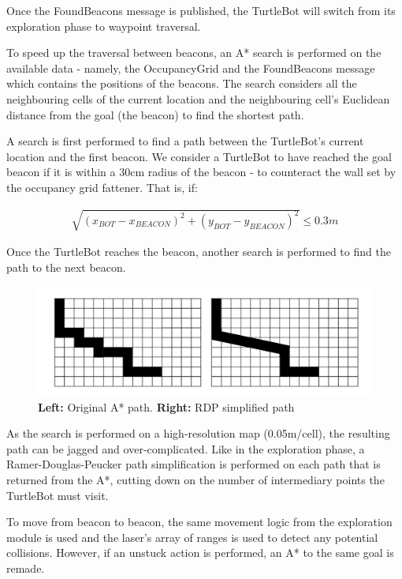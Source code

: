 \documentclass[titlepage,12pt,a4paper]{article}
\begin{document}
Once the FoundBeacons message is published, the TurtleBot will switch from its exploration phase to waypoint traversal.

To speed up the traversal between beacons, an A* search is performed on the available data - namely, the OccupancyGrid and the FoundBeacons message which contains the positions of the beacons. The search considers all the neighbouring cells of the current location and the neighbouring cell's Euclidean distance from the goal (the beacon) to find the shortest path. 

A search is first performed to find a path between the TurtleBot's current location and the first beacon. We consider a TurtleBot to have reached the goal beacon if it is within a 30cm radius of the beacon - to counteract the wall set by the occupancy grid fattener. That is, if: 

\begin{align*}
	\sqrt{(x_{BOT} - x_{BEACON})^2 + (y_{BOT} - y_{BEACON})^2} \leq 0.3m 
\end{align*}

Once the TurtleBot reaches the beacon, another search is performed to find the path to the next beacon.

\begin{figure}[h]
  	\begin{center}
	\includegraphics[scale=0.27]{rdpExample.jpg}
	\caption{\textbf{Left:} Original A* path. \textbf{Right:} RDP simplified path}
	\end{center}
\end{figure}

As the search is performed on a high-resolution map (0.05m/cell), the resulting path can be jagged and over-complicated. Like in the exploration phase, a Ramer-Douglas-Peucker path simplification is performed on each path that is returned from the A*, cutting down on the number of intermediary points the TurtleBot must visit.

To move from beacon to beacon, the same movement logic from the exploration module is used and the laser's array of ranges is used to detect any potential collisions. However, if an unstuck action is performed, an A* to the same goal is remade.
\end{document}
